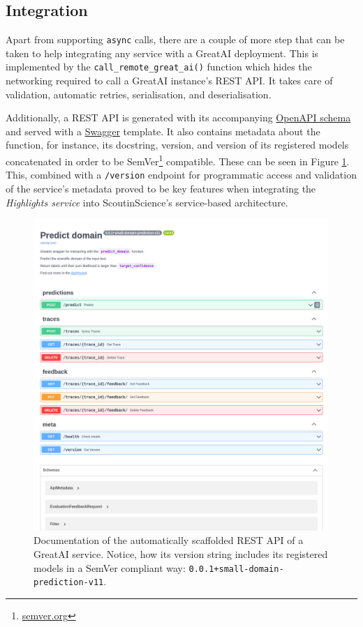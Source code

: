 \subsection{Integration}

Apart from supporting \texttt{async} calls, there are a couple of more step that can be taken to help integrating any service with a GreatAI deployment. This is implemented by the \texttt{call\_remote\_great\_ai()} function which hides the networking required to call a GreatAI instance's REST API. It takes care of validation, automatic retries, serialisation, and deserialisation.

Additionally, a REST API is generated with its accompanying \href{https://swagger.io/specification/}{OpenAPI schema} and served with a \href{https://swagger.io/}{Swagger} template. It also contains metadata about the function, for instance, its docstring, version, and version of its registered models concatenated in order to be SemVer\footnote{\href{https://semver.org/}{semver.org}} compatible. These can be seen in Figure \ref{fig:greatai-api}. This, combined with a \texttt{/version} endpoint for programmatic access and validation of the service's metadata proved to be key features when integrating the \textit{Highlights service} into ScoutinScience's service-based architecture.

\begin{figure}
    \centering
    \includegraphics[width=0.75\linewidth]{figures/greatai-api.png}
    \caption{Documentation of the automatically scaffolded REST API of a GreatAI service. Notice, how its version string includes its registered models in a SemVer compliant way: \texttt{0.0.1+small-domain-prediction-v11}.}
    \label{fig:greatai-api}
\end{figure}
